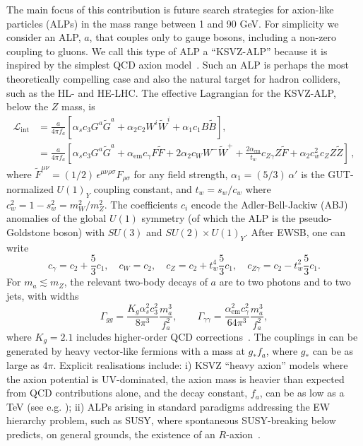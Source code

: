 The main focus of this contribution is future search strategies for axion-like particles (ALPs) in the mass range between 1 and 90 GeV.  For simplicity we consider an ALP, $a$, that couples only to gauge bosons, including a non-zero coupling to gluons.
We call this type of ALP a ``KSVZ-ALP'' because it is inspired by the simplest QCD axion model~\cite{Peccei:1977hh,Kim:1979if,Shifman:1979if}.
Such an ALP is perhaps the most theoretically compelling case and also the natural target for hadron colliders, such as the HL- and HE-LHC.  The effective Lagrangian for the KSVZ-ALP, below the $Z$ mass, is
%
\begin{align}
\mathcal{L}_{\text{int}}&= \frac{a}{4\pi f_a}\left[ \alpha_s c_3 G^a\tilde{G}^a+ \alpha_2 c_2 W^i\tilde{W}^i+ \alpha_1 c_1 B\tilde{B}\right],
\label{eq:LaFFdual}\\
&= \frac{a}{4\pi f_a}\left[ \alpha_s c_3 G^a\tilde{G}^a\!+ \alpha_{\text{em}} c_{\gamma} F\tilde{F}\!+\!2\alpha_2 c_W W^{-}\tilde{W}^{+}\!+\!\frac{2\alpha_{\text{em}}}{t_w} c_{Z\gamma} Z\tilde{F}\!+\alpha_2 c_w^2 c_{Z} Z\tilde{Z}\right]\,,\label{eq:La123}
\end{align}
%
where $\tilde{F}^{\mu\nu}=(1/2)\,\epsilon^{\mu\nu\rho\sigma}F_{\rho\sigma}$ for any field strength, $\alpha_1=(5/3)\, \alpha'$ is the GUT-normalized $U(1)_Y$ coupling constant, and $t_w=s_w/c_w$ where $c_w^2=1-s_w^2=m_W^2/m_Z^2$.  The coefficients $c_i$ encode the Adler-Bell-Jackiw (ABJ) anomalies of the global $U(1)$ symmetry (of which the ALP is the pseudo-Goldstone boson) with $SU(3)$ and $SU(2)\times U(1)_Y$.
After EWSB, one can write
%
\begin{equation}
c_{\gamma}=c_2+\frac{5}{3}c_1,\quad c_W=c_2, \quad c_Z=c_2+t_w^4\frac{5}{3} c_1, \quad c_{Z\gamma}=c_2-t_w^2\frac{5}{3} c_1  .
\end{equation}
%
For $m_a \lesssim m_Z$, the relevant two-body decays of $a$ are to two photons and to two jets, with widths
%
\begin{equation} \label{eq:widths}
\Gamma_{gg}=\frac{K_g\alpha_s^2c_3^2}{8 \pi^3}  \frac{m_a^3}{f_a^2},
\qquad \Gamma_{\gamma\gamma}=\frac{\alpha_{\text{em}}^2c_\gamma^2}{64 \pi^3}  \frac{m_a^3}{f_a^2},
\end{equation}
%
where
$K_g=2.1$ includes higher-order QCD corrections~\cite{Djouadi:2005gj}.
The couplings in  can be generated by heavy vector-like fermions with a mass at $g_* f_a$, where $g_*$ can be as large as $4\pi$.
Explicit realisations include: i) KSVZ ``heavy axion'' models where the axion potential is UV-dominated, the axion mass is heavier than expected from QCD contributions alone, and the decay constant, $f_a$, can be as low as a TeV (see e.g. );
ii) ALPs arising in standard paradigms addressing the EW hierarchy problem, such as SUSY, where spontaneous SUSY-breaking below \Mpl predicts, on general grounds, the existence of an $R$-axion~\cite{Nelson:1993nf,Bellazzini:2017neg}.

